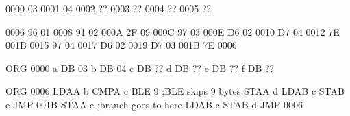 
0000 03
0001 04
0002 ??
0003 ??
0004 ??
0005 ??


0006 96 01
0008 91 02
000A 2F 09
000C 97 03
000E D6 02
0010 D7 04
0012 7E 001B
0015 97 04
0017 D6 02
0019 D7 03
001B 7E 0006

	ORG	0000
a	DB	03
b	DB	04
c	DB	??
d	DB	??
e	DB	??
f	DB	??

	ORG 0006
	LDAA	b
	CMPA	c
	BLE	9 ;BLE skips 9 bytes
	STAA	d
	LDAB	c
	STAB	e
	JMP	001B
	STAA	e ;branch goes to here
	LDAB	c
	STAB	d
	JMP	0006
